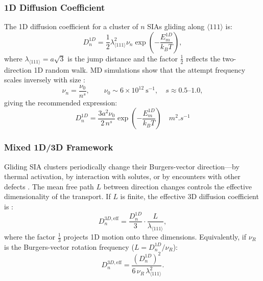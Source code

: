 \documentclass[pdflatex,sn-basic]{sn-jnl} %
\begin{document}
\subsubsection{1D Diffusion Coefficient}

The 1D diffusion coefficient for a cluster of $n$ SIAs gliding along $\langle111\rangle$ is:
\begin{equation}\label{eq:D1D}
    D_{n}^{1D} = \frac{1}{2}\lambda_{\langle111\rangle}^2 \nu_n \exp\!\left(-\frac{E_m^{1D}}{k_B T}\right),
\end{equation}
where $\lambda_{\langle111\rangle} = a\sqrt{3}$ is the jump distance and the factor $\frac{1}{2}$ reflects the two-direction 1D random walk. MD simulations show that the attempt frequency scales inversely with size \citep{Osetsky2003, Anento2010}:
\begin{equation}\label{eq:nu_n}
    \nu_n = \frac{\nu_0}{n^s}, \qquad \nu_0 \sim 6 \times 10^{12}~\text{s}^{-1}, \quad s \approx 0.5\text{--}1.0,
\end{equation}
giving the recommended expression:
\begin{equation}\label{eq:D1D_boxed}
    \boxed{D_n^{1D} = \frac{3a^2 \nu_0}{2\,n^s} \exp\!\left(-\frac{E_m^{1D}}{k_B T}\right) \quad \si{m^2.s^{-1}}}
\end{equation}

\subsubsection{Mixed 1D/3D Framework}

Gliding SIA clusters periodically change their Burgers-vector direction---by thermal activation, by interaction with solutes, or by encounters with other defects \citep{Heinisch2000}. The mean free path $L$ between direction changes controls the effective dimensionality of the transport. If $L$ is finite, the effective 3D diffusion coefficient is \citep{Trinkaus2002, Heinisch2000}:
\begin{equation}\label{eq:D3D_eff}
    D_n^{3D,\mathrm{eff}} = \frac{D_n^{1D}}{3} \cdot \frac{L}{\lambda_{\langle111\rangle}},
\end{equation}
where the factor $\frac{1}{3}$ projects 1D motion onto three dimensions. Equivalently, if $\nu_R$ is the Burgers-vector rotation frequency ($L = D_n^{1D}/\nu_R$):
\begin{equation}\label{eq:D3D_eff_alt}
    D_n^{3D,\mathrm{eff}} = \frac{(D_n^{1D})^2}{6\,\nu_R\,\lambda_{\langle111\rangle}^2}.
\end{equation}
\end{document}
